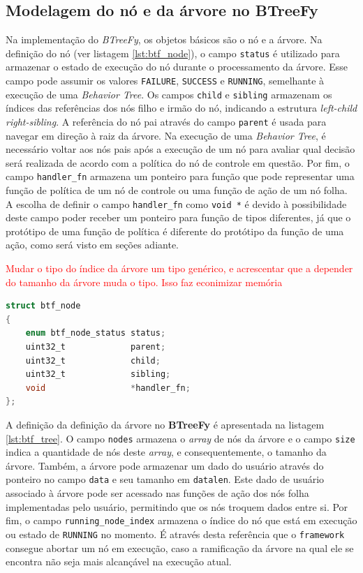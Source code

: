 \documentclass[conference]{IEEEtran}
\newcommand{\red}{\textcolor{red}}
\begin{document}
\subsection{Modelagem do nó e da árvore no BTreeFy}

Na implementação do \textit{BTreeFy}, os objetos básicos são o nó e a árvore. Na definição do nó (ver listagem \ref{lst:btf_node}), o campo \texttt{status} é utilizado para armazenar o estado de execução do nó durante o processamento da árvore. Esse campo pode assumir os valores \texttt{FAILURE}, \texttt{SUCCESS} e \texttt{RUNNING}, semelhante à execução de uma \textit{Behavior Tree}. Os campos \texttt{child} e \texttt{sibling} armazenam os índices das referências dos nós filho e irmão do nó, indicando a estrutura \textit{left-child right-sibling}. A referência do nó pai através do campo \texttt{parent} é usada para navegar em direção à raiz da árvore. Na execução de uma \textit{Behavior Tree}, é necessário voltar aos nós pais após a execução de um nó para avaliar qual decisão será realizada de acordo com a política do nó de controle em questão. Por fim, o campo \texttt{handler\_fn} armazena um ponteiro para função que pode representar uma função de política de um nó de controle ou uma função de ação de um nó folha. A escolha de definir o campo \texttt{handler\_fn} como \texttt{void *} é devido à possibilidade deste campo poder receber um ponteiro para função de tipos diferentes, já que o protótipo de uma função de política é diferente do protótipo da função de uma ação, como será visto em seções adiante.

\red{Mudar o tipo do índice da árvore um tipo genérico, e acrescentar que a depender do tamanho da árvore muda o tipo. Isso faz econimizar memória }

\begin{lstlisting}[language=C, caption={Definição do objeto nó no \textit{BTreeFy}}, label={lst:btf_node}]
struct btf_node
{
    enum btf_node_status status;
    uint32_t             parent;
    uint32_t             child;
    uint32_t             sibling;
    void                 *handler_fn;
};
\end{lstlisting}

A definição da definição da árvore no \textbf{BTreeFy} é apresentada na listagem \ref{lst:btf_tree}. O campo \texttt{nodes} armazena o \textit{array} de nós da árvore e o campo \texttt{size} indica a quantidade de nós deste \textit{array}, e consequentemente, o tamanho da árvore. Também, a árvore pode armazenar um dado do usuário através do ponteiro no campo \texttt{data} e seu tamanho em \texttt{datalen}. Este dado de usuário associado à árvore pode ser acessado nas funções de ação dos nós folha implementadas pelo usuário, permitindo que os nós troquem dados entre si. Por fim, o campo \texttt{running\_node\_index} armazena o índice do nó que está em execução ou estado de \texttt{RUNNING} no momento. É através desta referência que o \texttt{framework} consegue abortar um nó em execução, caso a ramificação da árvore na qual ele se encontra não seja mais alcançável na execução atual.
\end{document}
